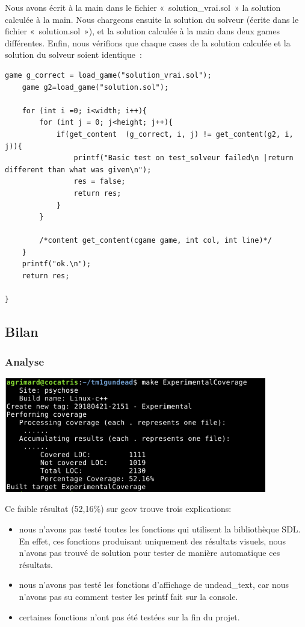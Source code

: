 \documentclass[12]{article}
\begin{document}
Nous avons écrit à la main dans le fichier « solution\_vrai.sol » la solution calculée à la main. Nous chargeons ensuite la solution du solveur (écrite dans le fichier « solution.sol »), et la solution calculée à la main dans deux games différentes. Enfin, nous vérifions que chaque cases de la solution calculée et la solution du solveur soient identique :

\begin{lstlisting}[style=CStyle]
    game g_correct = load_game("solution_vrai.sol");
    game g2=load_game("solution.sol");

    for (int i =0; i<width; i++){
        for (int j = 0; j<height; j++){
            if(get_content  (g_correct, i, j) != get_content(g2, i, j)){
                printf("Basic test on test_solveur failed\n	|return different than what was given\n");
                res = false;
                return res;
            }
        }

        /*content get_content(cgame game, int col, int line)*/
    }
    printf("ok.\n");
    return res;

}
\end{lstlisting}

\subsection{Bilan}

\subsubsection{Analyse}

\includegraphics[height=5cm]{gcov}

Ce faible résultat (52,16\%) sur gcov trouve trois explications:
\begin{itemize}
\item nous n’avons pas testé toutes les fonctions qui utilisent la bibliothèque SDL. En effet, ces fonctions produisant uniquement des résultats visuels, nous n’avons pas trouvé de solution pour tester de manière automatique ces résultats.
\item nous n’avons pas testé les fonctions d’affichage de undead\_text, car nous n’avons pas su comment tester les printf fait sur la console.
\item certaines fonctions n'ont pas été testées sur la fin du projet.
\end{itemize}
\end{document}

